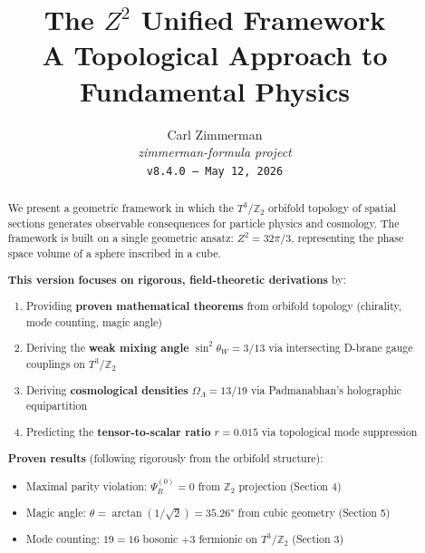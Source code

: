 \documentclass[12pt,a4paper]{article}
\newcommand{\Ztwo}{\mathbb{Z}_2}
\newcommand{\Tthree}{T^3}
\newcommand{\OmegaL}{\Omega_\Lambda}
\newcommand{\sinW}{\sin^2\theta_W}
\newcommand{\Zsq}{Z^2}
\begin{document}
\title{\textbf{The $Z^2$ Unified Framework}\\[0.5em]
\large A Topological Approach to Fundamental Physics}

\author{Carl Zimmerman\\[0.5em]
\small\textit{zimmerman-formula project}\\
\small\texttt{v8.4.0 --- May 12, 2026}}

\date{}

\maketitle

\begin{abstract}

We present a geometric framework in which the $\Tthree/\Ztwo$ orbifold topology of spatial sections generates observable consequences for particle physics and cosmology. The framework is built on a single geometric ansatz: $\Zsq = 32\pi/3$, representing the phase space volume of a sphere inscribed in a cube.

\textbf{This version focuses on rigorous, field-theoretic derivations} by:
\begin{enumerate}[itemsep=0pt]
    \item Providing \textbf{proven mathematical theorems} from orbifold topology (chirality, mode counting, magic angle)
    \item Deriving the \textbf{weak mixing angle} $\sinW = 3/13$ via intersecting D-brane gauge couplings on $\Tthree/\Ztwo$
    \item Deriving \textbf{cosmological densities} $\OmegaL = 13/19$ via Padmanabhan's holographic equipartition
    \item Predicting the \textbf{tensor-to-scalar ratio} $r = 0.015$ via topological mode suppression
\end{enumerate}

\textbf{Proven results} (following rigorously from the orbifold structure):
\begin{itemize}[itemsep=0pt]
    \item Maximal parity violation: $\Psi_R^{(0)} = 0$ from $\Ztwo$ projection (Section 4)
    \item Magic angle: $\theta = \arctan(1/\sqrt{2}) = 35.26°$ from cubic geometry (Section 5)
    \item Mode counting: $19 = 16$ bosonic $+ 3$ fermionic on $\Tthree/\Ztwo$ (Section 3)
\end{itemize}


\end{abstract}
\end{document}
